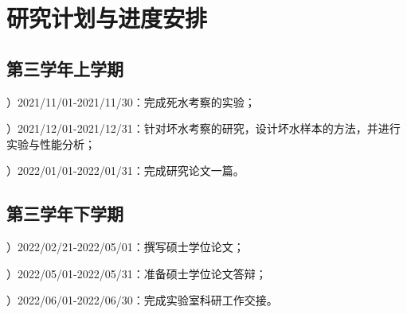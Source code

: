 \chapter{研究计划与进度安排}

\section{第三学年上学期}

）2021/11/01-2021/11/30：完成死水考察的实验；

）2021/12/01-2021/12/31：针对坏水考察的研究，设计坏水样本的方法，并进行实验与性能分析；

）2022/01/01-2022/01/31：完成研究论文一篇。

\section{第三学年下学期}

）2022/02/21-2022/05/01：撰写硕士学位论文；

）2022/05/01-2022/05/31：准备硕士学位论文答辩；

）2022/06/01-2022/06/30：完成实验室科研工作交接。